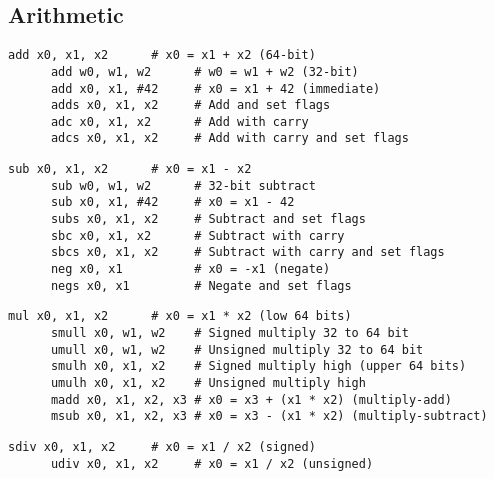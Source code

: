 \subsection{Arithmetic} 

  \begin{definition}[Addition]
    \begin{lstlisting}[language=arm]
      add x0, x1, x2      # x0 = x1 + x2 (64-bit)
      add w0, w1, w2      # w0 = w1 + w2 (32-bit)
      add x0, x1, #42     # x0 = x1 + 42 (immediate)
      adds x0, x1, x2     # Add and set flags
      adc x0, x1, x2      # Add with carry
      adcs x0, x1, x2     # Add with carry and set flags
    \end{lstlisting}
  \end{definition}

  \begin{definition}[Subtraction]
    \begin{lstlisting}[language=arm]
      sub x0, x1, x2      # x0 = x1 - x2
      sub w0, w1, w2      # 32-bit subtract
      sub x0, x1, #42     # x0 = x1 - 42
      subs x0, x1, x2     # Subtract and set flags
      sbc x0, x1, x2      # Subtract with carry
      sbcs x0, x1, x2     # Subtract with carry and set flags
      neg x0, x1          # x0 = -x1 (negate)
      negs x0, x1         # Negate and set flags
    \end{lstlisting}
  \end{definition}

  \begin{definition}[Multiplication]
    \begin{lstlisting}[language=arm]
      mul x0, x1, x2      # x0 = x1 * x2 (low 64 bits)
      smull x0, w1, w2    # Signed multiply 32 to 64 bit
      umull x0, w1, w2    # Unsigned multiply 32 to 64 bit
      smulh x0, x1, x2    # Signed multiply high (upper 64 bits)
      umulh x0, x1, x2    # Unsigned multiply high
      madd x0, x1, x2, x3 # x0 = x3 + (x1 * x2) (multiply-add)
      msub x0, x1, x2, x3 # x0 = x3 - (x1 * x2) (multiply-subtract)
    \end{lstlisting}
  \end{definition}

  \begin{definition}[Division]
    \begin{lstlisting}[language=arm]
      sdiv x0, x1, x2     # x0 = x1 / x2 (signed)
      udiv x0, x1, x2     # x0 = x1 / x2 (unsigned)
    \end{lstlisting}
  \end{definition}

